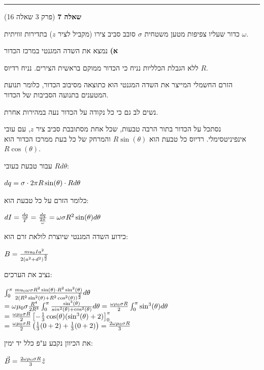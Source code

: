 \documentclass[14pt]{extarticle}
\makeatletter
\newenvironment{lefteqs}{%
    \begin{english}%
    \begin{flushleft}%
    \renewcommand{\arraystretch}{1.3}%
    $\begin{array}{@{}l@{}}%
}{%
    \end{array}$%
    \end{flushleft}%
    \end{english}%
}
\makeatother
\begin{document}
\vspace{3em}
\hrule
\vspace{2em}

\textbf{\large שאלה 7}
(פרק 3 שאלה 16)

כדור שעליו צפיפות מטען משטחית $\sigma$ סובב סביב צירו (מקביל לציר $z$) בתדירות זוויתית $\omega$.

\textbf{א)}
נמצא את השדה המגנטי במרכז הכדור

ללא הגבלת הכלליות נניח כי הכדור ממוקם בראשית הצירים. נניח רדיוס $R$.

הזרם החשמלי המייצר את השדה המגנטי הוא כתוצאה מסיבוב הכדור, כלומר תנועת המטענים בתנועה הסביבות של הכדור.

נשים לב גם כי כל נקודה על הכדור נעה במהירות אחרת.

נסתכל על הכדור בתור הרבה טבעות, שכל אחת מסתובבת סביב ציר $z$, עם עובי אינפיניטסימלי.
רדיוס כל טבעת  הוא $R\sin(\theta)$ והמרחק של כל בעת ממרכז הכדור הוא $R\cos(\theta)$.

עבור טבעת בעובי $Rd\theta$:
\begin{lefteqs}
    dq = \sigma \cdot 2\pi R \sin(\theta) \cdot Rd\theta 
\end{lefteqs}
כלומר הזרם על כל טבעת הוא:
\begin{lefteqs}
    dI = \frac{dq}{T} = \frac{dq}{\frac{2\pi}{\omega}} = \omega \sigma R^2 \sin(\theta) d\theta
\end{lefteqs}
כידוע השדה המגנטי שיוצרת לולאת זרם הוא:
\begin{lefteqs}
    B = \frac{mu_0 I a^2}{2(a^2+d^2)^{\frac{3}{2}}}
\end{lefteqs}
נציב את הערכים:
\begin{lefteqs}
    \int_0^\pi \frac{mu_0 \omega \sigma R^2 \sin(\theta) \cdot R^2 \sin^2(\theta)}{2(R^2\sin^2(\theta) + R^2\cos^2(\theta))^{\frac{3}{2}}} d\theta \\
    = \omega \mu_0 \sigma \frac{R^4}{2R^3} \int_0^\pi \frac{\sin^3(\theta)}{sin^2(\theta) + \cos^2(\theta)} d\theta = \frac{\omega \mu_0 \sigma R}{2} \int_0^\pi \sin^3(\theta) d\theta \\
    = \frac{\omega \mu_0 \sigma R}{2} \left[-\frac{1}{3}\cos(\theta)(\sin^3(\theta) + 2) \right]_0^\pi \\
    = \frac{\omega \mu_0 \sigma R}{2} \left(\frac{1}{3}(0+2) + \frac{1}{3}(0+2) \right) = \frac{2\omega \mu_0 \sigma R}{3}
\end{lefteqs}

את הכיוון נקבע ע"פ כלל יד ימין:
\begin{lefteqs}
    \vec{B} = \frac{2\omega \mu_0 \sigma R}{3} \hat{z}
\end{lefteqs}
\end{document}
